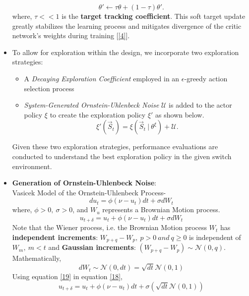\documentclass{article}
\begin{document}
\begin{itemize}
    \begin{equation}
        \theta' \longleftarrow \tau \theta + (1 - \tau) \theta'.
    \end{equation}
    where, $\tau << 1$ is the \textbf{target tracking coefficient}. This soft target update greatly stabilizes the learning process and mitigates divergence of the critic network's weights during training [\ref{4}].
    \item To allow for exploration within the design, we incorporate two exploration strategies:
    \begin{itemize}
        \item A \textit{Decaying Exploration Coefficient} employed in an $\epsilon$-greedy action selection process
        \item \textit{System-Generated Ornstein-Uhlenbeck Noise} $\mathcal{U}$ is added to the actor policy $\xi$ to create the exploration policy $\xi'$ as shown below.
        \begin{equation}
            \xi'(\vec{S}_t) = \xi(\vec{S}_t\ |\ \theta^{\xi}) + \mathcal{U}.
        \end{equation}
    \end{itemize}
    Given these two exploration strategies, performance evaluations are conducted to understand the best exploration policy in the given switch environment.
    \item \textbf{Generation of Ornstein-Uhlenbeck Noise}:
    \\Vasicek Model of the Ornstein-Uhlenbeck Process-
    \begin{equation}
        du_{t} = \phi(\nu - u_{t}) dt + \sigma dW_{t}
    \end{equation}
    where, $\phi > 0,\ \sigma > 0$, and $W_u$ represents a Brownian Motion process.
    \begin{equation}\label{18}
        u_{t+\delta} = u_{t} + \phi(\nu - u_{t}) dt + \sigma dW_{t}
    \end{equation}
    Note that the Wiener process, i.e. the Brownian Motion process $W_t$ has \textbf{independent increments}: $W_{p+q} - W_{p},\ p > 0\ and\ q \geq 0$ is independent of $W_{m},\ m < t$ and \textbf{Gaussian increments}: $(W_{p+q} - W_p) \sim \mathcal{N}(0, q)$.
    \\Mathematically,
    \begin{equation}\label{19}
        dW_{t} \sim \mathcal{N}(0, dt) = \sqrt{dt} \mathcal{N}(0, 1)
    \end{equation}
    Using equation \eqref{19} in equation \eqref{18},
    \begin{equation}
        u_{t+\delta} = u_{t} + \phi(\nu - u_{t}) dt + \sigma(\sqrt{dt} \mathcal{N}(0, 1))
    \end{equation}
\end{itemize}
\end{document}
